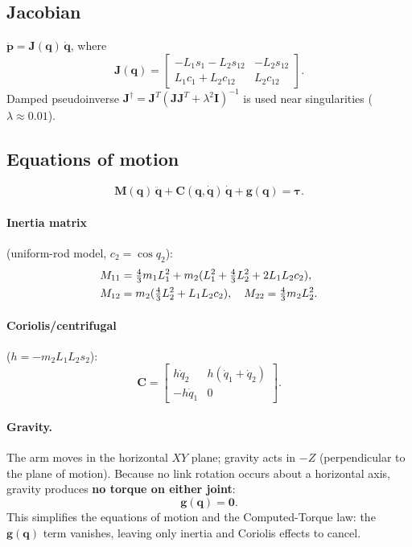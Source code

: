 \documentclass[11pt,a4paper]{article}
\newcommand{\vq}{\bm{q}}
\newcommand{\vqd}{\dot{\bm{q}}}
\newcommand{\vqdd}{\ddot{\bm{q}}}
\newcommand{\vtau}{\bm{\tau}}
\newcommand{\vpd}{\dot{\bm{p}}}
\newcommand{\M}{\bm{M}}
\newcommand{\Cor}{\bm{C}}
\newcommand{\vg}{\bm{g}}
\newcommand{\J}{\bm{J}}
\begin{document}
\subsection{Jacobian}

$\vpd = \J(\vq)\,\vqd$, where
\begin{equation}
  \J(\vq) = \begin{bmatrix}
    -L_1 s_1 - L_2 s_{12} & -L_2 s_{12} \\
     L_1 c_1 + L_2 c_{12} &  L_2 c_{12}
  \end{bmatrix}.
  \label{eq:jac}
\end{equation}
Damped pseudoinverse $\J^\dagger{=}\J^T(\J\J^T+\lambda^2\mathbf{I})^{-1}$
is used near singularities ($\lambda{\approx}0.01$).

\subsection{Equations of motion}

\begin{equation}
  \M(\vq)\,\vqdd + \Cor(\vq,\vqd)\,\vqd + \vg(\vq) = \vtau.
  \label{eq:eom}
\end{equation}

\paragraph{Inertia matrix} (uniform-rod model, $c_2{=}\cos q_2$):
\begin{align}
  M_{11} &= \tfrac{4}{3}m_1 L_1^2 + m_2(L_1^2 + \tfrac{4}{3}L_2^2 + 2L_1 L_2 c_2),\notag\\
  M_{12} &= m_2(\tfrac{4}{3}L_2^2 + L_1 L_2 c_2),\quad
  M_{22}  = \tfrac{4}{3}m_2 L_2^2.
  \label{eq:M}
\end{align}

\paragraph{Coriolis/centrifugal} ($h{=}{-}m_2 L_1 L_2 s_2$):
\begin{equation}
  \Cor = \begin{bmatrix}h\dot{q}_2 & h(\dot{q}_1{+}\dot{q}_2)\\
                        -h\dot{q}_1 & 0\end{bmatrix}.
  \label{eq:C}
\end{equation}

\paragraph{Gravity.}
The arm moves in the horizontal $XY$ plane; gravity acts in $-Z$ (perpendicular
to the plane of motion).  Because no link rotation occurs about a horizontal
axis, gravity produces \textbf{no torque on either joint}:
\begin{equation}
  \vg(\vq) = \mathbf{0}.
  \label{eq:grav}
\end{equation}
This simplifies the equations of motion and the Computed-Torque law: the
$\vg(\vq)$ term vanishes, leaving only inertia and Coriolis effects to cancel.
\end{document}
